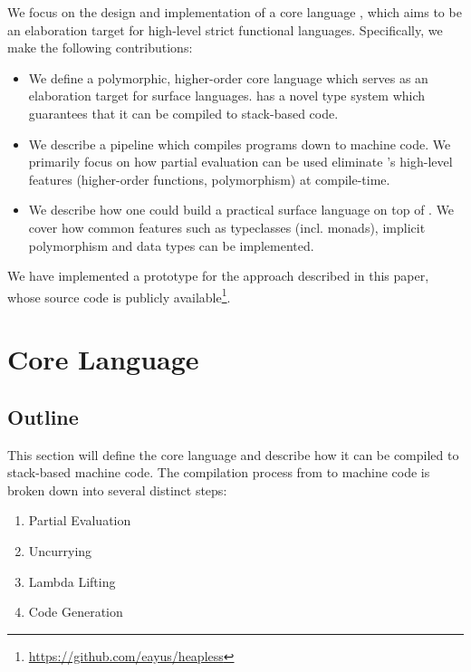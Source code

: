 \documentclass[runningheads]{llncs}
\begin{document}
We focus on the design and implementation of a core language \core{}, which aims to be an elaboration target for high-level strict functional languages. Specifically, we make the following contributions:

\begin{itemize}
  \item We define a polymorphic, higher-order core language \core{} which serves as an elaboration target for surface languages. \core{} has a novel type system which guarantees that it can be compiled to stack-based code.

  \item We describe a pipeline which compiles \core{} programs down to machine code. We primarily focus on how partial evaluation can be used eliminate \core{}'s high-level features (higher-order functions, polymorphism) at compile-time. 
  
  \item We describe how one could build a practical surface language on top of \core{}. We cover how common features such as typeclasses (incl. monads), implicit polymorphism and data types can be implemented.
\end{itemize}

We have implemented a prototype for the approach described in this paper, whose source code is publicly available\footnote{\url{https://github.com/eayus/heapless}}.

\section{Core Language}


\subsection{Outline}

This section will define the core language \core{} and describe how it can be compiled to stack-based machine code. The compilation process from \core{} to machine code is broken down into several distinct steps:

\begin{enumerate}
  \item Partial Evaluation
  \item Uncurrying
  \item Lambda Lifting
  \item Code Generation
\end{enumerate}
\end{document}
